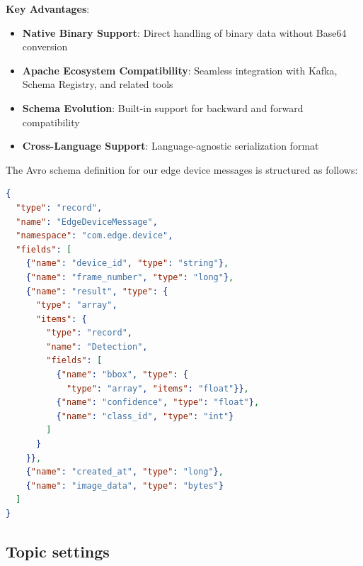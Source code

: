\documentclass[../main.tex]{subfiles}
\begin{document}
\textbf{Key Advantages}:
\begin{itemize}
    \item \textbf{Native Binary Support}: Direct handling of binary data without Base64 conversion
    \item \textbf{Apache Ecosystem Compatibility}: Seamless integration with Kafka, Schema Registry, and related tools
    \item \textbf{Schema Evolution}: Built-in support for backward and forward compatibility
    \item \textbf{Cross-Language Support}: Language-agnostic serialization format
\end{itemize}

The Avro schema definition for our edge device messages is structured as follows:

\begin{lstlisting}[language=json, caption={Avro schema definition for edge device messages}]
{
  "type": "record",
  "name": "EdgeDeviceMessage",
  "namespace": "com.edge.device",
  "fields": [
    {"name": "device_id", "type": "string"},
    {"name": "frame_number", "type": "long"},
    {"name": "result", "type": {
      "type": "array",
      "items": {
        "type": "record",
        "name": "Detection",
        "fields": [
          {"name": "bbox", "type": {
            "type": "array", "items": "float"}},
          {"name": "confidence", "type": "float"},
          {"name": "class_id", "type": "int"}
        ]
      }
    }},
    {"name": "created_at", "type": "long"},
    {"name": "image_data", "type": "bytes"}
  ]
}
\end{lstlisting}

\subsection{Topic settings}
\end{document}
